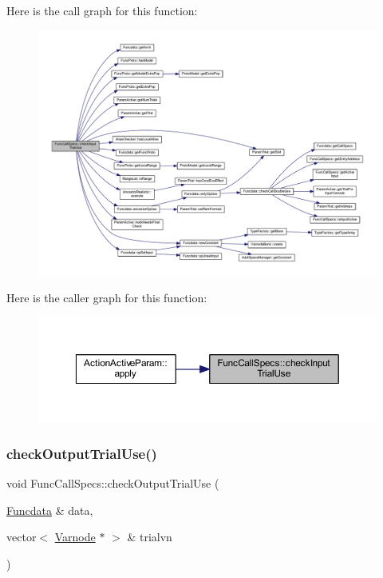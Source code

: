 Here is the call graph for this function\+:
\nopagebreak
\begin{figure}[H]
\begin{center}
\leavevmode
\includegraphics[width=350pt]{class_func_call_specs_ab49917128896eb002c816e361f875943_cgraph}
\end{center}
\end{figure}
Here is the caller graph for this function\+:
\nopagebreak
\begin{figure}[H]
\begin{center}
\leavevmode
\includegraphics[width=350pt]{class_func_call_specs_ab49917128896eb002c816e361f875943_icgraph}
\end{center}
\end{figure}
\mbox{\label{class_func_call_specs_a82c50f8299ce305411880fc61b8b1907}} 
\subsubsection{\texorpdfstring{checkOutputTrialUse()}{checkOutputTrialUse()}}
{\footnotesize\ttfamily void Func\+Call\+Specs\+::check\+Output\+Trial\+Use (\begin{DoxyParamCaption}\item[{\mbox{\hyperlink{class_funcdata}{Funcdata}} \&}]{data,  }\item[{vector$<$ \mbox{\hyperlink{class_varnode}{Varnode}} $\ast$ $>$ \&}]{trialvn }\end{DoxyParamCaption})}



